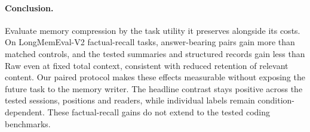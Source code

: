 \paragraph{Conclusion.}
Evaluate memory compression by the task utility it preserves alongside its
costs. On LongMemEval-V2 factual-recall tasks, answer-bearing pairs gain more
than matched controls, and the tested summaries and structured records gain
less than Raw even at fixed total context, consistent with reduced retention
of relevant content. Our paired protocol makes these effects measurable
without exposing the future task to the memory writer. The headline contrast
stays positive across the tested sessions, positions and readers, while
individual labels remain condition-dependent. These factual-recall gains do
not extend to the tested coding benchmarks.
